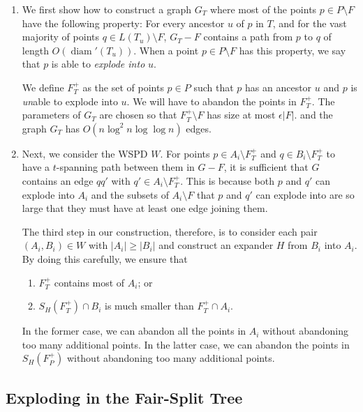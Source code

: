 \documentclass{patmorin}
\DeclareMathOperator{\diam}{diam}
\begin{document}
\begin{enumerate}
  \item We first show how to construct a graph $G_T$ where most of the
  points $p\in P\setminus F$ have the following property: For every
  ancestor $u$ of $p$ in $T$, and for the vast majority of points $q\in
  L(T_u)\setminus F$, $G_T-F$ contains a path from $p$ to $q$ of length
  $O(\diam'(T_u))$.  When a point $p\in P\setminus F$ has this property,
  we say that $p$ is able to \emph{explode into} $u$.

  We define $F^+_T$ as the set of points $p\in P$ such that $p$ has an
  ancestor $u$ and $p$ is \emph{un}able to explode into $u$.  We will
  have to abandon the points in $F^+_T$.  The parameters of $G_T$ are
  chosen so that $F^+_T\setminus F$ has size at most $\epsilon|F|$.
  and the graph $G_T$ has $O(n\log^2 n\log\log n)$ edges.

   \item Next, we consider the WSPD $W$. For points $p\in A_i\setminus
   F^+_T$ and $q\in B_i\setminus F^+_T$ to have a $t$-spanning path between
   them in $G-F$, it is sufficient that $G$ contains an edge $qq'$
   with $q'\in A_i\setminus F^+_T$.  This is because both $p$ and $q'$
   can explode into $A_i$ and the subsets of $A_i\setminus F$ that $p$
   and $q'$ can explode into are so large that they must have at least
   one edge joining them.

   The third step in our construction, therefore, is to consider each pair
   $(A_i,B_i)\in W$ with $|A_i|\ge |B_i|$ and construct an expander $H$
   from $B_i$ into $A_i$.  By doing this carefully, we ensure that
  \begin{enumerate}
     \item $F^+_T$ contains most of $A_i$; or
     \item $S_{H}(F^+_T)\cap B_i$ is much smaller than $F^+_T\cap A_i$.
  \end{enumerate}
  In the former case, we can abandon all the points in $A_i$ without
  abandoning too many additional points. In the latter case, we can
  abandon the points in $S_{H}(F^+_P)$ without abandoning too many additional 
  points.
\end{enumerate}



\subsection{Exploding in the Fair-Split Tree}
\end{document}
